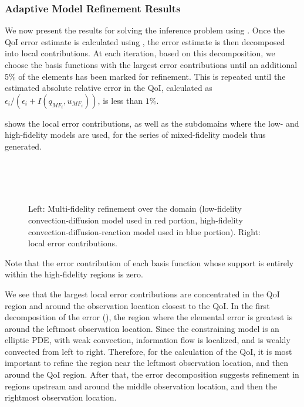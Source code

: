 \subsubsection{Adaptive Model Refinement Results} \label{sec:cdvcdrBaseRef}
%

We now present the results for solving the inference problem using . Once the QoI error estimate is calculated using , the error estimate is then decomposed into local contributions. At each iteration, based on this decomposition, we choose the basis functions with the largest error contributions until an additional 5\% of the elements has been marked for refinement. This is repeated until the estimated absolute relative error in the QoI, calculated as $\epsilon_i/(\epsilon_i+I(q_{MF_i},u_{MF_i}))$, is less than $1\%$.

 shows the local error contributions, as well as the subdomains where the low- and high-fidelity models are used, for the series of mixed-fidelity models thus generated. %
%
\begin{figure}[htbp]
\centering
{} \\
 \\
 \\
\caption{Left: Multi-fidelity refinement over the domain (low-fidelity convection-diffusion model used in red portion, high-fidelity convection-diffusion-reaction model used in blue portion). Right: local error contributions. }
\label{fig:baseRef}
\end{figure}
%
Note that the error contribution of each basis function whose support is entirely within the high-fidelity regions is zero.

We see that the largest local error contributions are concentrated in the QoI region and around the observation location closest to the QoI. In the first decomposition of the error (), the region where the elemental error is greatest is around the leftmost observation location. Since the constraining model is an elliptic PDE, with weak convection, information flow is localized, and is weakly convected from left to right. Therefore, for the calculation of the QoI, it is most important to refine the region near the leftmost observation location, and then around the QoI region. After that, the error decomposition suggests refinement in regions upstream and around the middle observation location, and then the rightmost observation location.

